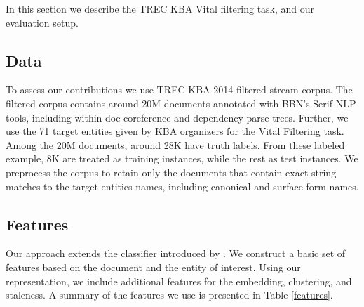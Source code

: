 \documentclass{article}
\begin{document}
In this section we describe the TREC KBA Vital filtering task, and our evaluation setup.

\subsection{Data}
\label{data}

To assess our contributions we use TREC KBA 2014 filtered stream corpus. The filtered corpus contains around 20M documents annotated with BBN's Serif NLP tools, including within-doc coreference and dependency parse trees. Further, we use the 71 target entities given by KBA organizers for the Vital Filtering task. Among the 20M documents, around 28K have truth labels. From these labeled example, 8K are treated as training instances, while the rest as test instances.
We preprocess the corpus to retain only the documents that contain exact string matches to the target entities names, including canonical and surface form names.

\subsection{Features}
\label{feat}

Our approach extends the classifier introduced by \citet{jingang13}.
We construct a basic set of features based on the document and the entity of interest.
Using our representation, we include additional features for the embedding, clustering, and staleness.
A summary of the features we use is presented in Table \ref{features}. 

\end{document}
